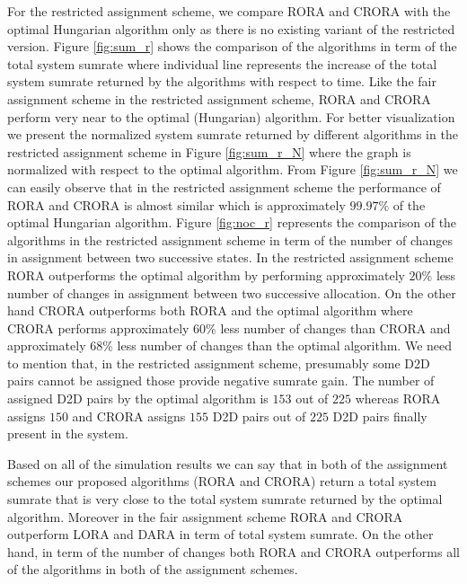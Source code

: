 \documentclass[times]{dacauth}
\begin{document}
\smallskip
\noindent
For the restricted assignment scheme, we compare RORA and CRORA with the optimal Hungarian algorithm only as there is no existing variant of the restricted version. Figure \ref{fig:sum_r} shows the comparison of the algorithms in term of the total system sumrate where individual line represents the increase of the total system sumrate returned by the algorithms with respect to time. Like the fair assignment scheme in the restricted assignment scheme, RORA and CRORA perform very near to the optimal (Hungarian) algorithm. For better visualization we present the normalized system sumrate returned by different algorithms in the restricted assignment scheme in Figure \ref{fig:sum_r_N} where the graph is normalized with respect to the optimal algorithm. From Figure \ref{fig:sum_r_N} we can easily observe that in the restricted assignment scheme the performance of RORA and CRORA is almost similar which is approximately $99.97\%$ of the optimal Hungarian algorithm. Figure  \ref{fig:noc_r} represents the comparison of the algorithms in the restricted assignment scheme in term of the number of changes in assignment between two successive states. In the restricted assignment scheme RORA outperforms the optimal algorithm by performing approximately $20\%$ less number of changes in assignment between two successive allocation. On the other hand  CRORA outperforms both RORA and the optimal algorithm where CRORA performs  approximately $60\%$ less number of changes than CRORA and approximately 68\% less number of changes than the optimal algorithm. We need to mention that, in the restricted assignment scheme, presumably some D2D pairs cannot be assigned those provide negative sumrate gain. The number of assigned D2D pairs by the optimal algorithm is $153$ out of $225$ whereas RORA assigns $150$ and CRORA assigns $155$ D2D pairs out of $225$ D2D pairs finally present in the system.  

\smallskip
\noindent
Based on all of the simulation results we can say that in both of the assignment schemes our proposed algorithms (RORA and CRORA) return a total system sumrate that is very close to the total system sumrate returned by the optimal algorithm. Moreover in the fair assignment scheme RORA and CRORA outperform LORA and DARA in term of total system sumrate. On the other hand, in term of the number of changes both RORA and CRORA outperforms all of the algorithms in both of the assignment schemes.
\end{document}
